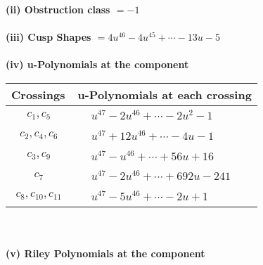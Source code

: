 \documentclass[1p]{elsarticle_modified}
\theoremstyle{definition}
\begin{document}
\flushleft \textbf{(ii) Obstruction class $= -1$}\\~\\
\flushleft \textbf{(iii) Cusp Shapes $= 4 u^{46}-4 u^{45}+\cdots-13 u-5$}\\~\\
\newpage\renewcommand{\arraystretch}{1}
\flushleft \textbf{(iv) u-Polynomials at the component}\newline \\
\begin{tabular}{m{50pt}|m{274pt}}
Crossings & \hspace{64pt}u-Polynomials at each crossing \\
\hline $$\begin{aligned}c_{1},c_{5}\end{aligned}$$&$\begin{aligned}
&u^{47}-2 u^{46}+\cdots-2 u^2-1
\end{aligned}$\\
\hline $$\begin{aligned}c_{2},c_{4},c_{6}\end{aligned}$$&$\begin{aligned}
&u^{47}+12 u^{46}+\cdots-4 u-1
\end{aligned}$\\
\hline $$\begin{aligned}c_{3},c_{9}\end{aligned}$$&$\begin{aligned}
&u^{47}- u^{46}+\cdots+56 u+16
\end{aligned}$\\
\hline $$\begin{aligned}c_{7}\end{aligned}$$&$\begin{aligned}
&u^{47}-2 u^{46}+\cdots+692 u-241
\end{aligned}$\\
\hline $$\begin{aligned}c_{8},c_{10},c_{11}\end{aligned}$$&$\begin{aligned}
&u^{47}-5 u^{46}+\cdots-2 u+1
\end{aligned}$\\
\hline
\end{tabular}\\~\\
\newpage\renewcommand{\arraystretch}{1}
\flushleft \textbf{(v) Riley Polynomials at the component}\newline \\
\end{document}
